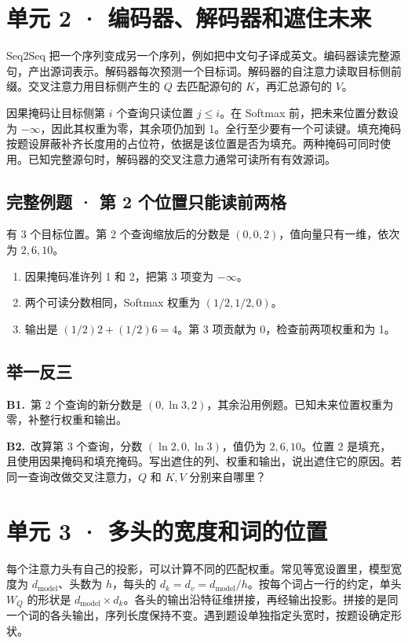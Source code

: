 \documentclass[UTF8,a4paper,11pt]{ctexart}
\newcommand{\PracticeQuestion}[3]{\par\Needspace{4\baselineskip}\noindent\begin{minipage}{\linewidth}\textbf{#1.}\ #2\par\noindent\rule{0pt}{#3mm}\par\end{minipage}\par}
\begin{document}
\section{单元 2 · 编码器、解码器和遮住未来}
Seq2Seq 把一个序列变成另一个序列，例如把中文句子译成英文。编码器读完整源句，产出源词表示。解码器每次预测一个目标词。解码器的自注意力读取目标侧前缀。交叉注意力用目标侧产生的 $Q$ 去匹配源句的 $K$，再汇总源句的 $V$。

因果掩码让目标侧第 $i$ 个查询只读位置 $j\le i$。在 Softmax 前，把未来位置分数设为 $-\infty$，因此其权重为零，其余项仍加到 1。全行至少要有一个可读键。填充掩码按题设屏蔽补齐长度用的占位符，依据是该位置是否为填充。两种掩码可同时使用。已知完整源句时，解码器的交叉注意力通常可读所有有效源词。

\subsection{完整例题 · 第 2 个位置只能读前两格}
有 3 个目标位置。第 2 个查询缩放后的分数是 $(0,0,2)$，值向量只有一维，依次为 $2,6,10$。

\begin{enumerate}
\item 因果掩码准许列 1 和 2，把第 3 项变为 $-\infty$。
\item 两个可读分数相同，Softmax 权重为 $(1/2,1/2,0)$。
\item 输出是 $(1/2)2+(1/2)6=4$。第 3 项贡献为 0，检查前两项权重和为 1。
\end{enumerate}
\subsection{举一反三}
\PracticeQuestion{B1}{第 2 个查询的新分数是 $(0,\ln3,2)$，其余沿用例题。已知未来位置权重为零，补整行权重和输出。}{24}
\PracticeQuestion{B2}{改算第 3 个查询，分数 $(\ln2,0,\ln3)$，值仍为 $2,6,10$。位置 2 是填充，且使用因果掩码和填充掩码。写出遮住的列、权重和输出，说出遮住它的原因。若同一查询改做交叉注意力，$Q$ 和 $K,V$ 分别来自哪里？}{34}
\clearpage
\section{单元 3 · 多头的宽度和词的位置}
每个注意力头有自己的投影，可以计算不同的匹配权重。常见等宽设置里，模型宽度为 $d_{\mathrm{model}}$、头数为 $h$，每头的 $d_k=d_v=d_{\mathrm{model}}/h$。按每个词占一行的约定，单头 $W_Q$ 的形状是 $d_{\mathrm{model}}\times d_k$。各头的输出沿特征维拼接，再经输出投影。拼接的是同一个词的各头输出，序列长度保持不变。遇到题设单独指定头宽时，按题设确定形状。
\end{document}

